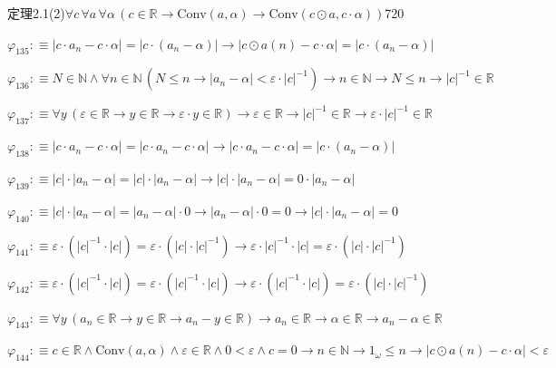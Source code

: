 \begin{fullproof}{定理2.1(2)}{$\forall c\,\forall a\,\forall \alpha\,(c \in \mathbb{R} \to \mathrm{Conv}(a,\alpha) \to \mathrm{Conv}(c \odot a,c \cdot \alpha))$}{720}
\begin{abbrevlist}
\item $\varphi_{135} :\equiv \lvert c \cdot a_{n} - c \cdot \alpha \rvert = \lvert c \cdot (a_{n} - \alpha) \rvert \to \lvert c \odot a(n) - c \cdot \alpha \rvert = \lvert c \cdot (a_{n} - \alpha) \rvert$
\item $\varphi_{136} :\equiv N \in \mathbb{N} \land \forall n \in \mathbb{N}\,(N \leq n \to \lvert a_{n} - \alpha \rvert < \varepsilon \cdot \lvert c \rvert^{-1}) \to n \in \mathbb{N} \to N \leq n \to \lvert c \rvert^{-1} \in \mathbb{R}$
\item $\varphi_{137} :\equiv \forall y\,(\varepsilon \in \mathbb{R} \to y \in \mathbb{R} \to \varepsilon \cdot y \in \mathbb{R}) \to \varepsilon \in \mathbb{R} \to \lvert c \rvert^{-1} \in \mathbb{R} \to \varepsilon \cdot \lvert c \rvert^{-1} \in \mathbb{R}$
\item $\varphi_{138} :\equiv \lvert c \cdot a_{n} - c \cdot \alpha \rvert = \lvert c \cdot a_{n} - c \cdot \alpha \rvert \to \lvert c \cdot a_{n} - c \cdot \alpha \rvert = \lvert c \cdot (a_{n} - \alpha) \rvert$
\item $\varphi_{139} :\equiv \lvert c \rvert \cdot \lvert a_{n} - \alpha \rvert = \lvert c \rvert \cdot \lvert a_{n} - \alpha \rvert \to \lvert c \rvert \cdot \lvert a_{n} - \alpha \rvert = 0 \cdot \lvert a_{n} - \alpha \rvert$
\item $\varphi_{140} :\equiv \lvert c \rvert \cdot \lvert a_{n} - \alpha \rvert = \lvert a_{n} - \alpha \rvert \cdot 0 \to \lvert a_{n} - \alpha \rvert \cdot 0 = 0 \to \lvert c \rvert \cdot \lvert a_{n} - \alpha \rvert = 0$
\item $\varphi_{141} :\equiv \varepsilon \cdot (\lvert c \rvert^{-1} \cdot \lvert c \rvert) = \varepsilon \cdot (\lvert c \rvert \cdot \lvert c \rvert^{-1}) \to \varepsilon \cdot \lvert c \rvert^{-1} \cdot \lvert c \rvert = \varepsilon \cdot (\lvert c \rvert \cdot \lvert c \rvert^{-1})$
\item $\varphi_{142} :\equiv \varepsilon \cdot (\lvert c \rvert^{-1} \cdot \lvert c \rvert) = \varepsilon \cdot (\lvert c \rvert^{-1} \cdot \lvert c \rvert) \to \varepsilon \cdot (\lvert c \rvert^{-1} \cdot \lvert c \rvert) = \varepsilon \cdot (\lvert c \rvert \cdot \lvert c \rvert^{-1})$
\item $\varphi_{143} :\equiv \forall y\,(a_{n} \in \mathbb{R} \to y \in \mathbb{R} \to a_{n} - y \in \mathbb{R}) \to a_{n} \in \mathbb{R} \to \alpha \in \mathbb{R} \to a_{n} - \alpha \in \mathbb{R}$
\item $\varphi_{144} :\equiv c \in \mathbb{R} \land \mathrm{Conv}(a,\alpha) \land \varepsilon \in \mathbb{R} \land 0 < \varepsilon \land c = 0 \to n \in \mathbb{N} \to 1_{\omega} \leq n \to \lvert c \odot a(n) - c \cdot \alpha \rvert < \varepsilon$

\end{abbrevlist}
\end{fullproof}

